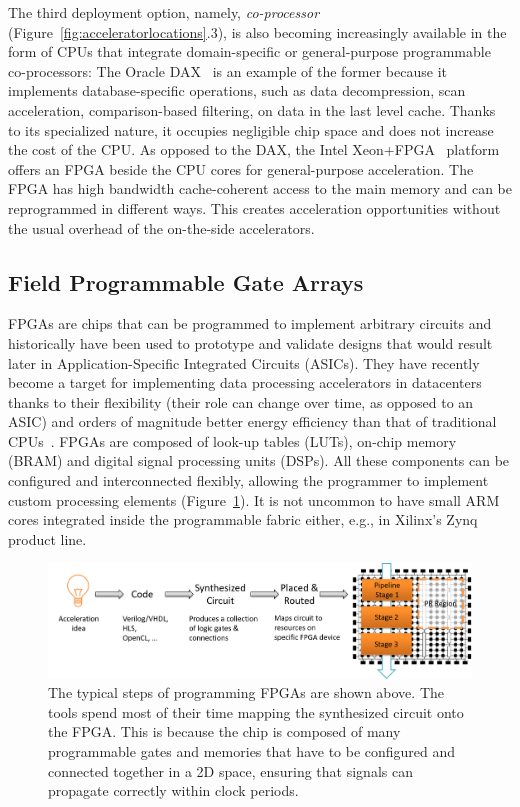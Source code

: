 \documentclass[11pt]{article}
\begin{document}
The third deployment option, namely, \emph{co-processor} (Figure~\ref{fig:acceleratorlocations}.3), is also becoming increasingly available in the form of CPUs that integrate domain-specific or general-purpose programmable co-processors: The Oracle DAX~\cite{aingaran-dax-hcs16} is an example of the former because it implements database-specific operations, such as data decompression, scan acceleration, comparison-based filtering, on data in the last level cache. Thanks to its specialized nature, it occupies negligible chip space and does not increase the cost of the CPU. As opposed to the DAX, the Intel Xeon+FPGA~\cite{gupta-harp-fpl16} platform offers an FPGA beside the CPU cores for general-purpose acceleration. The FPGA has high bandwidth cache-coherent access to the main memory and can be reprogrammed in different ways. This creates acceleration opportunities without the usual overhead of the on-the-side accelerators.


\subsection{Field Programmable Gate Arrays}

FPGAs are chips that can be programmed to implement arbitrary circuits and historically have been used to prototype and validate designs that would result later in Application-Specific Integrated Circuits (ASICs). They have recently become a target for implementing data processing accelerators in datacenters thanks to their flexibility (their role can change over time, as opposed to an ASIC) and orders of magnitude better energy efficiency than that of traditional CPUs~\cite{teubner-fpgabook-2011}. FPGAs are composed of look-up tables (LUTs), on-chip memory (BRAM) and digital signal processing units (DSPs). All these components can be configured and interconnected flexibly, allowing the programmer to implement custom processing elements (Figure~\ref{fig:insidefpga}). It is not uncommon to have small ARM cores integrated inside the programmable fabric either, e.g., in Xilinx's Zynq product line. 


\begin{figure}[h]
\centering
\includegraphics[width=0.9\linewidth]{figs/fpga-internal.PNG}
\vspace{-1em}
\caption{The typical steps of programming FPGAs are shown above. The tools spend most of their time mapping the synthesized circuit onto the FPGA. This is because the chip is composed of many programmable gates and memories that have to be configured and connected together in a 2D space, ensuring that signals can propagate correctly within clock periods.\label{fig:insidefpga}}
\end{figure}
\end{document}
